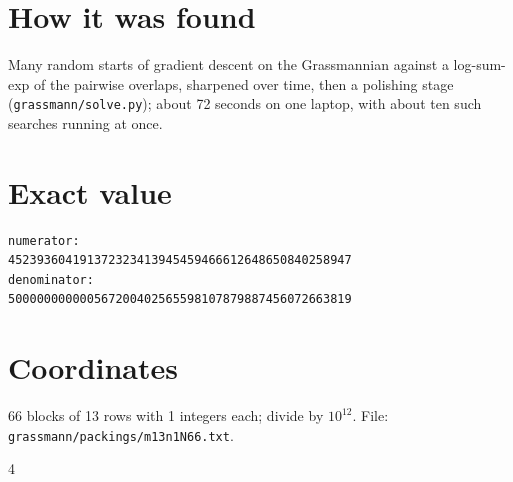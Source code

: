 \documentclass[11pt,a4paper]{article}
\begin{document}
\section{How it was found}
Many random starts of gradient descent on the Grassmannian against a log-sum-exp of the pairwise overlaps, sharpened over time, then a polishing stage (\texttt{grassmann/solve.py}); about 72 seconds on one laptop, with about ten such searches running at once.


\appendix
\section{Exact value}
{\small
\begin{verbatim}
numerator:
452393604191372323413945459466612648650840258947
denominator:
500000000000567200402565598107879887456072663819
\end{verbatim}}

\section{Coordinates}
66 blocks of 13 rows with 1 integers each; divide by $10^{12}$. File: \texttt{grassmann/packings/m13n1N66.txt}.
{\tiny
\begin{multicols}{4}
\end{multicols}}
\end{document}
